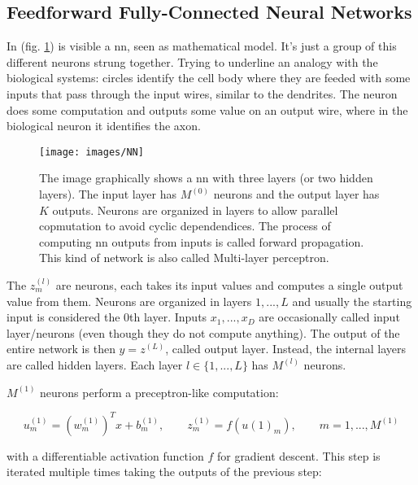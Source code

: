 \subsection{Feedforward Fully-Connected Neural Networks}
\label{nn:feedforward}

\noindent In (fig. \ref{fig:nn}) is visible a \gls{nn}, seen as mathematical model. It's just a group of this different neurons strung together. Trying to underline an analogy with the biological systems: circles identify the cell body where they are feeded with some inputs that pass through the input wires, similar to the dendrites. The neuron does some computation and outputs some value on an output wire, where in the biological neuron it identifies the axon.

\begin{figure}[H]
	\centering
	\texttt{[image: images/NN]}
	\caption[Feed forward neural network.]{The image graphically shows a \gls{nn} with three layers (or two hidden layers). The input layer has $M^{(0)}$ neurons and the output layer has $K$ outputs. Neurons are organized in  layers to allow parallel copmutation to avoid cyclic dependendices. The process of computing \gls{nn} outputs from inputs is called forward propagation. This kind of network is also called Multi-layer perceptron.}
	\label{fig:nn}
\end{figure}

\noindent The $z^{(l)}_m$ are neurons, each takes its input values and computes a single output value from them. Neurons are organized in layers $1,...,L$ and usually the starting input is considered the 0th layer. Inputs $x_1,...,x_D$ are occasionally called input layer/neurons (even though they do not compute anything). The output of the entire network is then $y=z^{(L)}$, called output layer. Instead, the internal layers are called hidden layers. Each layer $l\in \{1,...,L\}$ has $M^{(l)}$ neurons.

\noindent $M^{(1)}$ neurons perform a preceptron-like computation:

\begin{Equation}[H]
	\centering
	\begin{equation}
	u^{(1)}_m = (w^{(1)}_m)^T x + b^{(1)}_m,  
	\quad \quad
	z^{(1)}_m = f(u{(1)}_m),
	\quad \quad
	m=1,...,M^{(1)}
	\end{equation}
	\label{eq:hommatrix}
\end{Equation}

\noindent with a differentiable activation function $f$ for gradient descent. This step is iterated multiple times taking the outputs of the previous step:

